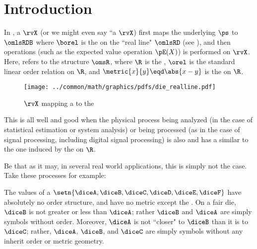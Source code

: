 \section{Introduction}
\begin{minipage}{\tw-10mm}
In , a  $\rvX$
(or we might even say ``a  $\rvX$)
first maps the underlying  $\ps$ to 
$\omlsRDB$ where $\borel$ is the 
on the ``real line" $\omlsRD$ (see ),
and then operations (such as the expected value operation $\pE(X)$) is performed on $\rvX$. 
Here,  refers to the structure $\omsR$, where $\R$ is the ,
$\orel$ is the standard linear order relation on $\R$, and $\metric{x}{y}\eqd\abs{x-y}$ is the 
 on $\R$.
\end{minipage}\hfill%
\begin{figure}[h]%
  \centering%
  \texttt{[image: ../common/math/graphics/pdfs/die\_realline.pdf]}%
  \caption{ $\rvX$ mapping a  to the  \label{fig:die_realline}}
\end{figure}

This is all well and good when the physical process being analyzed (in the case of statistical estimation 
or system analysis) or being processed (as in the case of signal processing, including digital signal processing)
is also  and has a  similar to the one induced 
by the  on $\R$.

Be that as it may, in several real world applications, this is simply not the case. 
Take these processes for example:

\begin{minipage}{\tw-50mm}\imarks
  The values of a  $\setn{\diceA,\diceB,\diceC,\diceD,\diceE,\diceF}$
  have absolutely no order structure, 
  and have no metric except the . 
  On a fair die, $\diceB$ is not greater or less than $\diceA$; rather $\diceB$ and $\diceA$ are simply symbols without order.
  Moreover, $\diceA$ is not ``closer" to $\diceB$ than it is to $\diceC$;
  rather, $\diceA$, $\diceB$, and $\diceC$ are simply symbols without any inherit order or metric geometry.
\end{minipage}\hfill{}

